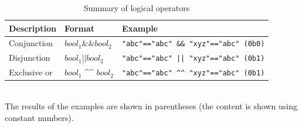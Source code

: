 \begin{table}[!hb]
\begin{center}
\caption{Summary of logical operators\label{tbl:mcal_bool}}
{\small
  \begin{tabular}{l|l|l} \hline
Description&Format&Example\\
\hline
Conjunction       & $bool_1 \&\& bool_2$ & \verb|"abc"=="abc" && "xyz"=="abc" (0b0)|\\
Disjunction       & $bool_1 ||   bool_2$ & \verb/"abc"=="abc" || "xyz"=="abc" (0b1)/\\
Exclusive or	& $bool_1$ \^{}\^{} $bool_2$ & \verb|"abc"=="abc" ^^ "xyz"=="abc" (0b1)|\\
\hline
  \end{tabular}
\\The results of the examples are shown in parentheses (the content is shown using constant numbers).
  }
  \end{center}
\end{table}

